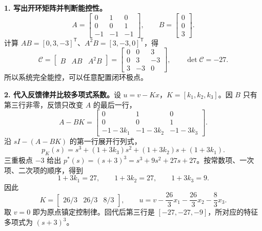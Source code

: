 

\sol\textbf{1. 写出开环矩阵并判断能控性。}
\[
    A=\begin{bmatrix}0&1&0\\0&0&1\\-1&-1&-1\end{bmatrix},
    \qquad B=\begin{bmatrix}0\\0\\3\end{bmatrix}.
\]
计算 $AB=[0,3,-3]^{\mathsf T}$、$A^2B=[3,-3,0]^{\mathsf T}$，得
\[
    \mathcal C=\begin{bmatrix}B&AB&A^2B\end{bmatrix}
    =\begin{bmatrix}0&0&3\\0&3&-3\\3&-3&0\end{bmatrix},
    \qquad \det\mathcal C=-27 .
\]
所以系统完全能控，可以任意配置闭环极点。

\textbf{2. 代入反馈律并比较多项式系数。}设 $u=v-Kx$，$K=[k_1,k_2,k_3]$。因 $B$ 只有第三行非零，反馈只改变 $A$ 的最后一行，
\[
    A-BK=\begin{bmatrix}
        0&1&0\\0&0&1\\
        -1-3k_1&-1-3k_2&-1-3k_3
    \end{bmatrix}.
\]
沿 $sI-(A-BK)$ 的第一行展开行列式，
\[
    p_K(s)=s^3+(1+3k_3)s^2+(1+3k_2)s+(1+3k_1).
\]
三重极点 $-3$ 给出 $p^\ast(s)=(s+3)^3=s^3+9s^2+27s+27$。按常数项、一次项、二次项的顺序，得到
\[
    1+3k_1=27,\qquad 1+3k_2=27,\qquad 1+3k_3=9.
\]
因此
\[
    \boxed{K=\begin{bmatrix}26/3&26/3&8/3\end{bmatrix}},
    \qquad
    u=v-\frac{26}{3}x_1-\frac{26}{3}x_2-\frac{8}{3}x_3 .
\]
取 $v=0$ 即为原点镇定控制律。回代后第三行是 $[-27,-27,-9]$，所对应的特征多项式为 $(s+3)^3$。

